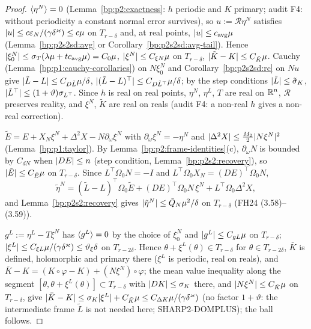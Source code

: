 \begin{proof}
\label{step:p2s2:st-n}
$\langle \eta^N\rangle=0$ (Lemma~\ref{bp:p2:exactness}: $h$ periodic and $K$ primary; audit F4: without periodicity a constant normal error survives), so
$u:=\mathcal R\eta^N$ satisfies $\lvert u\rvert\le c\varepsilon_N/(\gamma\delta^\varkappa)\le c\mu$ on $T_{r-\delta}$ and, at real points,
$\lvert u\rvert\le c_{\mathrm{avg}}\mu$ (Lemma~\ref{bp:p2s2sd:avg} or Corollary~\ref{bp:p2s2sd:avg-tail}). Hence $\lvert \xi^N_0\rvert\le\sigma_T(\lambda\mu+tc_{\mathrm{avg}}\mu)=C_0\mu$,
$\lvert \xi^N\rvert\le C_{\xi N}\mu$ on $T_{r-\delta}$, $\lvert \tilde K-K\rvert\le C_{\tilde K}\mu$. Cauchy (Lemma~\ref{bp:p1:cauchy-corollaries}) on $N\xi^N_0$ and
Corollary~\ref{bp:p2s2sd:rc} on $Nu$ give $\lvert \tilde L-L\rvert\le C_{D\tilde L}\mu/\delta$, $\lvert (\tilde L-L)^\top\rvert\le C_{D\tilde L^\top}\mu/\delta$; by the step conditions
$\lvert \tilde L\rvert\le\tilde\sigma_K$, $\lvert \tilde L^\top\rvert\le(1+\vartheta)\sigma_{L^\top}$. Since $h$ is real on real points, $\eta^N$, $\eta^L$, $T$ are real on $\mathbb{R}^n$, $\mathcal R$
preserves reality, and $\xi^N$, $\tilde K$ are real on reals (audit F4: a non-real $h$ gives a non-real correction).

\label{step:p2s2:st-int}
$\tilde E=E+X_N\xi^N+\Delta^2X-N\partial_\omega\xi^N$ with $\partial_\omega\xi^N=-\eta^N$ and $\lvert \Delta^2X\rvert\le\frac{M_2}2\lvert N\xi^N\rvert^2$ (Lemma~\ref{bp:p1:taylor}). By
Lemma~\ref{bp:p2:frame-identities}(c), $\partial_\omega N$ is bounded by $C_{dN}$ when $\lvert DE\rvert\le n$ (step condition, Lemma~\ref{bp:p2s2:recovery}), so
$\lvert \tilde E\rvert\le C_{\tilde E}\mu$ on $T_{r-\delta}$. Since $L^\top\Omega_0N=-I$ and $L^\top\Omega_0X_N=(DE)^\top\Omega_0N$,
\[
\tilde\eta^N=(\tilde L-L)^\top\Omega_0\tilde E+(DE)^\top\Omega_0N\,\xi^N+L^\top\Omega_0\Delta^2X,
\]
and Lemma~\ref{bp:p2s2:recovery} gives $\lvert \tilde\eta^N\rvert\le\tilde Q_N\mu^2/\delta$ on $T_{r-\delta}$ (FH24 (3.58)--(3.59)).

\label{step:p2s2:st-l}
$g^L:=\eta^L-T\xi^N$ has $\langle g^L\rangle=0$ by the choice of $\xi^N_0$ and $\lvert g^L\rvert\le C_{gL}\mu$ on $T_{r-\delta}$; $\lvert \xi^L\rvert\le C_{\xi L}\mu/(\gamma\delta^\varkappa)\le\vartheta_\xi\delta$ on
$T_{r-2\delta}$. Hence $\theta+\xi^L(\theta)\in T_{r-\delta}$ for $\theta\in T_{r-2\delta}$, $\bar K$ is defined, holomorphic and primary there ($\xi^L$ is periodic, real on reals), and
$\bar K-K=(K\circ\varphi-K)+(N\xi^N)\circ\varphi$; the mean value inequality along the segment $[\theta,\theta+\xi^L(\theta)]\subset T_{r-\delta}$ with $\lvert DK\rvert\le\sigma_K$
there, and $\lvert N\xi^N\rvert\le C_{\tilde K}\mu$ on $T_{r-\delta}$, give $\lvert \bar K-K\rvert\le\sigma_K\lvert \xi^L\rvert+C_{\tilde K}\mu\le C_{\Delta K}\mu/(\gamma\delta^\varkappa)$ (no factor $1+\vartheta$:
the intermediate frame $\tilde L$ is not needed here; SHARP2-DOMPLUS); the ball follows.


\end{proof}

